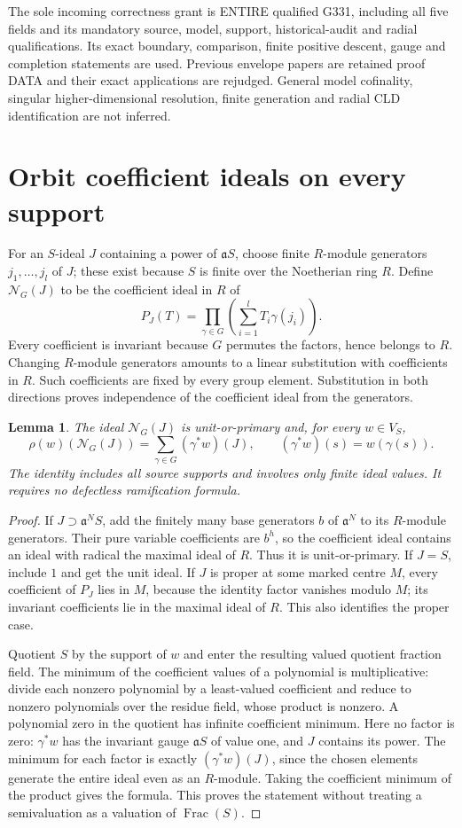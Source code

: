 \documentclass[11pt]{article}
\newtheorem{lemma}[theorem]{Lemma}
\newcommand{\aideal}{\mathfrak a}
\newcommand{\Nideal}{\mathcal N_G}
\begin{document}
The sole incoming correctness grant is ENTIRE qualified G331, including
all five fields and its mandatory source, model, support, historical-audit
and radial qualifications. Its exact boundary, comparison, finite
positive descent, gauge and completion statements are used. Previous
envelope papers are retained proof DATA and their exact applications are
rejudged. General model cofinality, singular higher-dimensional resolution,
finite generation and radial CLD identification are not inferred.

\section{Orbit coefficient ideals on every support}
For an $S$-ideal $J$ containing a power of $\aideal S$, choose finite
$R$-module generators $j_1,\ldots,j_l$ of $J$; these exist because
$S$ is finite over the Noetherian ring $R$. Define $\Nideal(J)$ to
be the coefficient ideal in $R$ of
\[
 P_J(T)=\prod_{\gamma\in G}
              \left(\sum_{i=1}^l T_i\gamma(j_i)\right).
\]
Every coefficient is invariant because $G$ permutes the factors, hence
belongs to $R$. Changing $R$-module generators amounts to a linear
substitution with coefficients in $R$. Such coefficients are fixed by
every group element. Substitution in both directions proves independence
of the coefficient ideal from the generators.

\begin{lemma}\label{orbit:norm}
The ideal $\Nideal(J)$ is unit-or-primary and, for every $w\in V_S$,
\[
 \rho(w)(\Nideal(J))=\sum_{\gamma\in G}(\gamma^*w)(J),
 \qquad (\gamma^*w)(s)=w(\gamma(s)).
\]
The identity includes all source supports and involves only finite ideal
values. It requires no defectless ramification formula.
\end{lemma}
\begin{proof}
If $J\supset\aideal^N S$, add the finitely many base generators
$b$ of $\aideal^N$ to its $R$-module generators. Their pure variable
coefficients are $b^h$, so the coefficient ideal contains an ideal with
radical the maximal ideal of $R$. Thus it is unit-or-primary. If $J=S$,
include $1$ and get the unit ideal. If $J$ is proper at some marked
centre $M$, every coefficient of $P_J$ lies in $M$, because the identity
factor vanishes modulo $M$; its invariant coefficients lie in the maximal
ideal of $R$. This also identifies the proper case.

Quotient $S$ by the support of $w$ and enter the resulting valued
quotient fraction field. The minimum of the coefficient values of a
polynomial is multiplicative: divide each nonzero polynomial by a
least-valued coefficient and reduce to nonzero polynomials over the
residue field, whose product is nonzero. A polynomial zero in the
quotient has infinite coefficient minimum. Here no factor is zero:
$\gamma^*w$ has the invariant gauge $\aideal S$ of value one, and
$J$ contains its power. The minimum for each factor is exactly
$(\gamma^*w)(J)$, since the chosen elements generate the entire ideal
even as an $R$-module. Taking the coefficient minimum of the product
gives the formula. This proves the statement without treating a
semivaluation as a valuation of $\operatorname{Frac}(S)$.
\end{proof}
\end{document}
